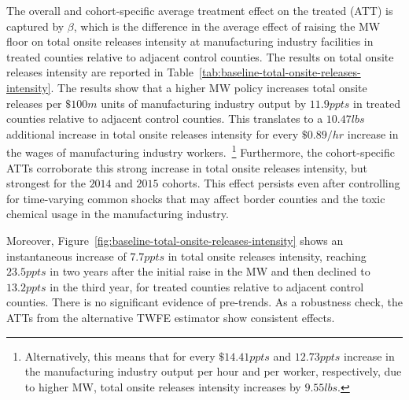 \documentclass[12pt, english]{article}
\begin{document}
    The overall and cohort-specific average treatment effect on the treated (ATT) is captured by $\beta$, which is the difference in the average effect of raising the MW floor on total onsite releases intensity at manufacturing industry facilities in treated counties relative to adjacent control counties. The results on total onsite releases intensity are reported in Table~\ref{tab:baseline-total-onsite-releases-intensity}. The results show that a higher MW policy increases total onsite releases per $\$100m$ units of manufacturing industry output by $11.9ppts$ in treated counties relative to adjacent control counties. This translates to a $10.47lbs$ additional increase in total onsite releases intensity for every $\$0.89/hr$ increase in the wages of manufacturing industry workers.~\footnote{\tiny Alternatively, this means that for every $\$14.41ppts$ and $12.73ppts$ increase in the manufacturing industry output per hour and per worker, respectively, due to higher MW, total onsite releases intensity increases by $9.55lbs$.} Furthermore, the cohort-specific ATTs corroborate this strong increase in total onsite releases intensity, but strongest for the $2014$ and $2015$ cohorts. This effect persists even after controlling for time-varying common shocks that may affect border counties and the toxic chemical usage in the manufacturing industry.
    

    Moreover, Figure~\ref{fig:baseline-total-onsite-releases-intensity} shows an instantaneous increase of $7.7ppts$ in total onsite releases intensity, reaching $23.5ppts$ in two years after the initial raise in the MW and then declined to $13.2ppts$ in the third year, for treated counties relative to adjacent control counties. There is no significant evidence of pre-trends. As a robustness check, the ATTs from the alternative TWFE estimator show consistent effects.
\end{document}
